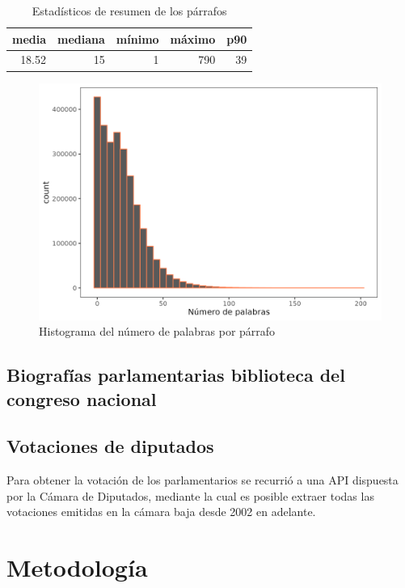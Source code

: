 \documentclass[
  12pt,
]{article}
\begin{document}
\begin{table}[H]

\caption{\label{tab:descripcion_parrafos}Estadísticos de resumen de los párrafos}
\centering
\begin{tabular}[t]{rrrrr}
\toprule
media & mediana & mínimo & máximo & p90\\
\midrule
18.52 & 15 & 1 & 790 & 39\\
\bottomrule
\end{tabular}
\end{table}

\begin{figure}[H]
\centering
\large
\caption{Histograma del número de palabras por párrafo}
\label{plot_descripcion_parrafos}
\includegraphics[width = 0.5 \textwidth]{cuadros_tesis/plot_hist_descripcion_parrafos.png}
\normalsize
\end{figure}

\hypertarget{biografuxedas-parlamentarias-biblioteca-del-congreso-nacional}{%
\subsection{Biografías parlamentarias biblioteca del congreso
nacional}\label{biografuxedas-parlamentarias-biblioteca-del-congreso-nacional}}

\hypertarget{votaciones-de-diputados}{%
\subsection{Votaciones de diputados}\label{votaciones-de-diputados}}

Para obtener la votación de los parlamentarios se recurrió a una API
dispuesta por la Cámara de Diputados, mediante la cual es posible
extraer todas las votaciones emitidas en la cámara baja desde 2002 en
adelante.

\hypertarget{metodologuxeda}{%
\section{Metodología}\label{metodologuxeda}}
\end{document}
